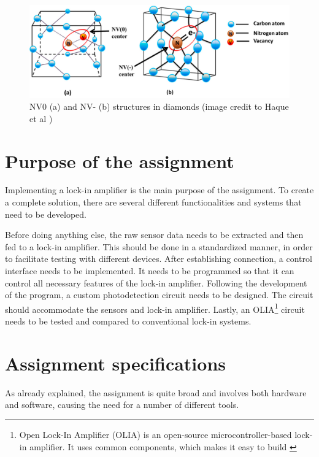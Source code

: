 \documentclass{report}
\begin{document}
	\begin{figure}[ht]
		\centering
		\includegraphics[width=0.7\linewidth]{img/nv_center}
		\caption{NV0 (a) and NV- (b) structures in diamonds (image credit to Haque et al \cite{haque2017overview})}
		\label{fig:nvcenter}
	\end{figure}
	
	
	\section{Purpose of the assignment}\label{purpose}
	Implementing a lock-in amplifier is the main purpose of the assignment. To create a complete solution, there are several different functionalities and systems that need to be developed. 
	
	Before doing anything else, the raw sensor data needs to be extracted and then fed to a lock-in amplifier. This should be done in a standardized manner, in order to facilitate testing with different devices. After establishing connection, a control interface needs to be implemented. It needs to be programmed so that it can control all necessary features of the lock-in amplifier. Following the development of the program, a custom photodetection circuit needs to be designed. The circuit should accommodate the sensors and lock-in amplifier. Lastly, an OLIA\footnote{Open Lock-In Amplifier (OLIA) is an open-source microcontroller-based lock-in amplifier. It uses common components, which makes it easy to build \cite{harvie2023olia}} circuit needs to be tested and compared to conventional lock-in systems. 
	
	
	\section{Assignment specifications}\label{specifications}
	As already explained, the assignment is quite broad and involves both hardware and software, causing the need for a number of different tools. 
	
\end{document}
